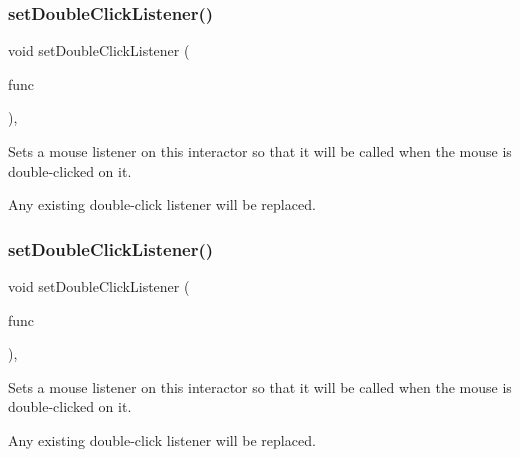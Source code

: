 \subsubsection{\texorpdfstring{set\+Double\+Click\+Listener()}{setDoubleClickListener()}\hspace{0.1cm}{\footnotesize\ttfamily [1/2]}}
{\footnotesize\ttfamily void set\+Double\+Click\+Listener (\begin{DoxyParamCaption}\item[{\mbox{\hyperlink{namespacesgl_ae9f3e9eab70035da1a2b114e21357b25}{G\+Event\+Listener}}}]{func }\end{DoxyParamCaption})\hspace{0.3cm}{\ttfamily [virtual]}, {\ttfamily [inherited]}}



Sets a mouse listener on this interactor so that it will be called when the mouse is double-\/clicked on it. 

Any existing double-\/click listener will be replaced. \mbox{\label{classsgl_1_1GInteractor_a50096194d66f48c92dd4c512d41bfc76}} 
\subsubsection{\texorpdfstring{set\+Double\+Click\+Listener()}{setDoubleClickListener()}\hspace{0.1cm}{\footnotesize\ttfamily [2/2]}}
{\footnotesize\ttfamily void set\+Double\+Click\+Listener (\begin{DoxyParamCaption}\item[{\mbox{\hyperlink{namespacesgl_a54427ce97bb1c2804e4fe2b0a62e8b17}{G\+Event\+Listener\+Void}}}]{func }\end{DoxyParamCaption})\hspace{0.3cm}{\ttfamily [virtual]}, {\ttfamily [inherited]}}



Sets a mouse listener on this interactor so that it will be called when the mouse is double-\/clicked on it. 

Any existing double-\/click listener will be replaced. \mbox{\label{classsgl_1_1GInteractor_ab831367dd84bbd579e02e55bacb21343}} 

